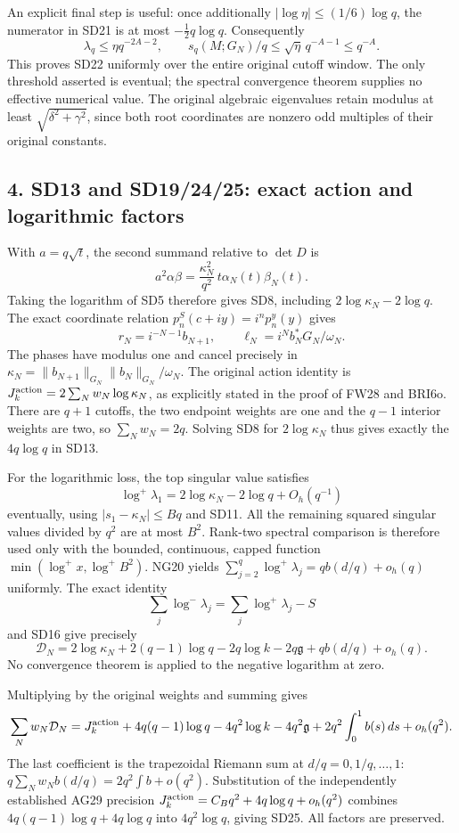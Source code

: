 An explicit final step is useful: once additionally \(|\log\eta|\le(1/6)\log q\), the numerator in SD21 is at most \(-\tfrac12q\log q\). Consequently \[
\lambda_q\le\eta q^{-2A-2},\qquad
s_q(M;G_N)/q\le\sqrt\eta\,q^{-A-1}\le q^{-A}.
\] This proves SD22 uniformly over the entire original cutoff window. The only threshold asserted is eventual; the spectral convergence theorem supplies no effective numerical value. The original algebraic eigenvalues retain modulus at least \(\sqrt{\delta^2+\gamma^2}\), since both root coordinates are nonzero odd multiples of their original constants.

\subsection{4. SD13 and SD19/24/25: exact action and logarithmic factors}\label{osdind:sd13-and-sd192425-exact-action-and-logarithmic-factors}

With \(a=q\sqrt t\), the second summand relative to \(\det D\) is \[
a^2\alpha\beta
=\frac{\kappa_N^2}{q^2}\,t\alpha_N(t)\beta_N(t).
\] Taking the logarithm of SD5 therefore gives SD8, including \(2\log\kappa_N-2\log q\). The exact coordinate relation \(p_n^S(c+iy)=i^np_n^y(y)\) gives \[
r_N=i^{-N-1}b_{N+1},\qquad
\ell_N=i^N b_N^*G_N/\omega_N.
\] The phases have modulus one and cancel precisely in \(\kappa_N=\|b_{N+1}\|_{G_N}\|b_N\|_{G_N}/\omega_N\). The original action identity is \(J_k^{\rm action}=2\sum_Nw_N\log\kappa_N\), as explicitly stated in the proof of FW28 and BRI6o. There are \(q+1\) cutoffs, the two endpoint weights are one and the \(q-1\) interior weights are two, so \(\sum_Nw_N=2q\). Solving SD8 for \(2\log\kappa_N\) thus gives exactly the \(4q\log q\) in SD13.

For the logarithmic loss, the top singular value satisfies \[
\log^+\lambda_1=2\log\kappa_N-2\log q+O_h(q^{-1})
\] eventually, using \(|s_1-\kappa_N|\le Bq\) and SD11. All the remaining squared singular values divided by \(q^2\) are at most \(B^2\). Rank-two spectral comparison is therefore used only with the bounded, continuous, capped function \(\min(\log^+x,\log^+B^2)\). NG20 yields \(\sum_{j=2}^q\log^+\lambda_j=qb(d/q)+o_h(q)\) uniformly. The exact identity \[
\sum_j\log^-\lambda_j=\sum_j\log^+\lambda_j-S
\] and SD16 give precisely \[
\mathcal D_N=2\log\kappa_N+2(q-1)\log q
-2q\log k-2q\mathfrak g+qb(d/q)+o_h(q).
\] No convergence theorem is applied to the negative logarithm at zero.

Multiplying by the original weights and summing gives \[
\sum_Nw_N\mathcal D_N=J_k^{\rm action}
+4q(q-1)\log q-4q^2\log k-4q^2\mathfrak g
+2q^2\int_0^1b(s)\,ds+o_h(q^2).
\] The last coefficient is the trapezoidal Riemann sum at \(d/q=0,1/q,\ldots,1\): \(q\sum_Nw_Nb(d/q)=2q^2\int b+o(q^2)\). Substitution of the independently established AG29 precision \(J_k^{\rm action}=C_Bq^2+4q\log q+o_h(q^2)\) combines \(4q(q-1)\log q+4q\log q\) into \(4q^2\log q\), giving SD25. All factors are preserved.

